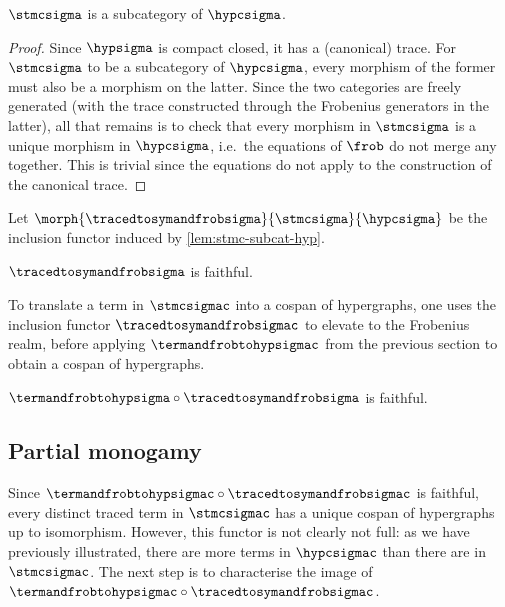\begin{lemma}
    \label{lem:stmc-subcat-hyp}
    \(\stmcsigma\) is a subcategory of \(\hypcsigma\).
\end{lemma}
\begin{proof}
    Since \(\hypsigma\) is compact closed, it has a (canonical) trace.
    For \(\stmcsigma\) to be a subcategory of \(\hypcsigma\), every morphism
    of the former must also be a morphism on the latter.
    Since the two categories are freely generated (with the trace constructed
    through the Frobenius generators in the latter), all that remains is to
    check that every morphism in \(\stmcsigma\) is a unique morphism in
    \(\hypcsigma\), i.e.\ the equations of \(\frob\) do not merge any together.
    This is trivial since the equations do not apply to the construction of the
    canonical trace.
\end{proof}

\begin{definition}
    Let \(\morph{\tracedtosymandfrobsigma}{\stmcsigma}{\hypcsigma}\) be the
    inclusion functor induced by \cref{lem:stmc-subcat-hyp}.
\end{definition}

\begin{corollary}
    \(\tracedtosymandfrobsigma\) is faithful.
\end{corollary}

To translate a term in \(\stmcsigmac\) into a cospan of hypergraphs, one uses
the inclusion functor \(\tracedtosymandfrobsigmac\) to elevate to the
Frobenius realm, before applying \(\termandfrobtohypsigmac\) from the previous
section to obtain a cospan of hypergraphs.

\begin{corollary}
    \(\termandfrobtohypsigma \circ \tracedtosymandfrobsigma\) is faithful.
\end{corollary}

\subsection{Partial monogamy}

Since \(\termandfrobtohypsigmac \circ \tracedtosymandfrobsigmac\) is faithful,
every distinct traced term in \(\stmcsigmac\) has a unique cospan of
hypergraphs up to isomorphism.
However, this functor is not clearly not full: as we have previously
illustrated, there are more terms in \(\hypcsigmac\) than there are in
\(\stmcsigmac\).
The next step is to characterise the image of
\(\termandfrobtohypsigmac \circ \tracedtosymandfrobsigmac\).

